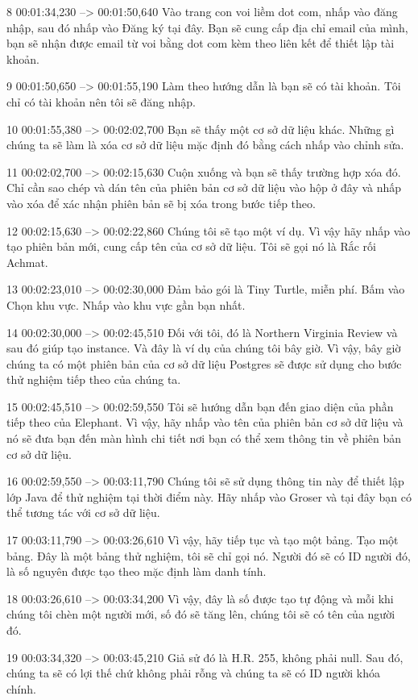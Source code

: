 8
00:01:34,230 --> 00:01:50,640
Vào trang con voi liềm dot com, nhấp vào đăng nhập, sau đó nhấp vào Đăng ký tại đây.  Bạn sẽ cung cấp địa chỉ email của mình, bạn sẽ nhận được email từ voi bằng dot com kèm theo liên kết để thiết lập tài khoản.

9
00:01:50,650 --> 00:01:55,190
Làm theo hướng dẫn là bạn sẽ có tài khoản.  Tôi chỉ có tài khoản nên tôi sẽ đăng nhập.

10
00:01:55,380 --> 00:02:02,700
Bạn sẽ thấy một cơ sở dữ liệu khác.  Những gì chúng ta sẽ làm là xóa cơ sở dữ liệu mặc định đó bằng cách nhấp vào chỉnh sửa.

11
00:02:02,700 --> 00:02:15,630
Cuộn xuống và bạn sẽ thấy trường hợp xóa đó.  Chỉ cần sao chép và dán tên của phiên bản cơ sở dữ liệu vào hộp ở đây và nhấp vào xóa để xác nhận phiên bản sẽ bị xóa trong bước tiếp theo.

12
00:02:15,630 --> 00:02:22,860
Chúng tôi sẽ tạo một ví dụ.  Vì vậy hãy nhấp vào tạo phiên bản mới, cung cấp tên của cơ sở dữ liệu.  Tôi sẽ gọi nó là Rắc rối Achmat.

13
00:02:23,010 --> 00:02:30,000
Đảm bảo gói là Tiny Turtle, miễn phí.  Bấm vào Chọn khu vực.  Nhấp vào khu vực gần bạn nhất.

14
00:02:30,000 --> 00:02:45,510
Đối với tôi, đó là Northern Virginia Review và sau đó giúp tạo instance.  Và đây là ví dụ của chúng tôi bây giờ.  Vì vậy, bây giờ chúng ta có một phiên bản của cơ sở dữ liệu Postgres sẽ được sử dụng cho bước thử nghiệm tiếp theo của chúng ta.

15
00:02:45,510 --> 00:02:59,550
Tôi sẽ hướng dẫn bạn đến giao diện của phần tiếp theo của Elephant.  Vì vậy, hãy nhấp vào tên của phiên bản cơ sở dữ liệu và nó sẽ đưa bạn đến màn hình chi tiết nơi bạn có thể xem thông tin về phiên bản cơ sở dữ liệu.

16
00:02:59,550 --> 00:03:11,790
Chúng tôi sẽ sử dụng thông tin này để thiết lập lớp Java để thử nghiệm tại thời điểm này.  Hãy nhấp vào Groser và tại đây bạn có thể tương tác với cơ sở dữ liệu.

17
00:03:11,790 --> 00:03:26,610
Vì vậy, hãy tiếp tục và tạo một bảng.  Tạo một bảng.  Đây là một bảng thử nghiệm, tôi sẽ chỉ gọi nó.  Người đó sẽ có ID người đó, là số nguyên được tạo theo mặc định làm danh tính.

18
00:03:26,610 --> 00:03:34,200
Vì vậy, đây là số được tạo tự động và mỗi khi chúng tôi chèn một người mới, số đó sẽ tăng lên, chúng tôi sẽ có tên của người đó.

19
00:03:34,320 --> 00:03:45,210
Giả sử đó là H.R. 255, không phải null.  Sau đó, chúng ta sẽ có lợi thế chứ không phải rỗng và chúng ta sẽ có ID người khóa chính.


